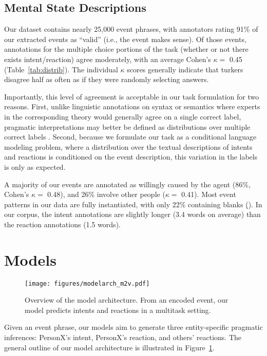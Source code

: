 \documentclass[11pt,a4paper]{article}
\newcommand{\blank}{$\underbar{ }\underbar{ }$\xspace}
\begin{document}
\subsection{Mental State Descriptions}
Our  dataset contains nearly 25,000 event phrases, with annotators rating 91\% of our extracted events as ``valid'' (i.e., the event makes sense).
Of those events, annotations for the multiple choice portions of the task (whether or not there exists intent/reaction) agree moderately, with an average Cohen's $\kappa=$ 0.45 (Table~\ref{tab:distrib}).
The individual $\kappa$ scores generally indicate that turkers disagree half as often as if they were randomly selecting answers. 

Importantly, this level of agreement is acceptable in our task formulation for two reasons. First, 
unlike linguistic annotations on syntax or semantics where experts in the corresponding theory would generally agree on a single correct label, pragmatic interpretations may better be defined as distributions over multiple correct labels \citep[e.g., after \texttt{PersonX takes a test}, PersonX might feel relieved and/or stressed;][]{Marneffe2012DidIH}.
Second, because we formulate our task as a conditional language modeling problem, where  a distribution over the textual descriptions of intents and reactions is conditioned on the event description, this variation in the labels is only as expected.

A majority of our events are annotated as willingly caused by the agent (86\%,
Cohen's $\kappa=$ 0.48), and 26\% involve other people ($\kappa=$ 0.41).
Most event patterns in our data are fully instantiated, with only 22\% containing blanks (\texttt{\blank}).
In our corpus, the intent annotations are slightly longer (3.4 words on average) than the reaction annotations (1.5 words).
 \section{Models}
\begin{figure}[tb]
\centering
\texttt{[image: figures/modelarch\_m2v.pdf]}
\caption{Overview of the model architecture. From an encoded event, our model predicts intents and reactions in a multitask setting.}
\label{fig:modelArchitecture}
\end{figure}



Given an event phrase, our models aim to generate three entity-specific pragmatic inferences:  PersonX's intent, PersonX's reaction, and others' reactions. 
The general outline of our model architecture is illustrated in Figure~\ref{fig:modelArchitecture}.
\end{document}
